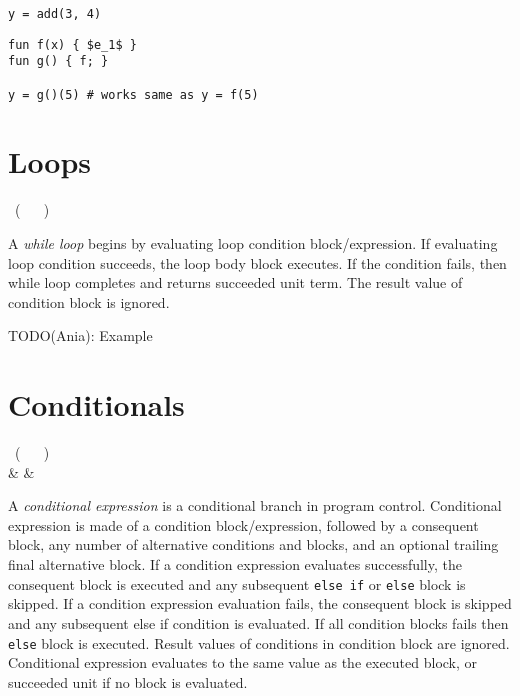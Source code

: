 \begin{example}
\begin{lstlisting}
y = add(3, 4)
\end{lstlisting}
\end{example}

\begin{example}
\begin{lstlisting}[mathescape=true]
fun f(x) { $e_1$ }
fun g() { f; }

y = g()(5) # works same as y = f(5)
\end{lstlisting}
\end{example}

\section{Loops}

\begin{bnf}
   \eq {} \ ( \  \gor {} \ ) \ 
\end{bnf}

A \emph{while loop} begins by evaluating loop condition block/expression. If evaluating loop condition succeeds, the loop body block executes. If the condition fails, then while loop completes and returns succeeded unit term. The result value of condition block is ignored.

TODO(Ania): Example

\section{Conditionals}

\begin{bnf}
   \eq {} \ ( \  \gor {} \ ) \  \\
              & & 
\end{bnf}

A \emph{conditional expression} is a conditional branch in program control. Conditional expression is made of a condition block/expression, followed by a consequent block, any number of alternative conditions and blocks, and an optional trailing final alternative block. If a condition expression evaluates successfully, the consequent block is executed and any subsequent \lstinline{else if} or \lstinline{else} block is skipped. If a condition expression evaluation fails, the consequent block is skipped and any subsequent else if condition is evaluated. If all condition blocks fails then \lstinline{else} block is executed. Result values of conditions in condition block are ignored. Conditional expression evaluates to the same value as the executed block, or succeeded unit if no block is evaluated.


